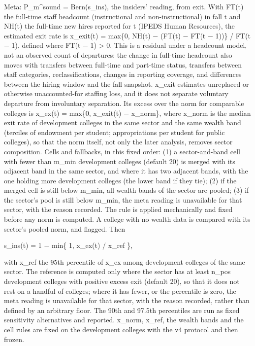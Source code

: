 \documentclass[
]{article}
\begin{document}
Meta: P\_m\^{}sound = Bern(s\_ins), the insiders' reading, from exit.
With FT(t) the full-time staff headcount (instructional and
non-instructional) in fall t and NH(t) the full-time new hires reported
for t (IPEDS Human Resources), the estimated exit rate is x\_exit(t) =
max\{0, NH(t) − (FT(t) − FT(t − 1))\} / FT(t − 1), defined where FT(t −
1) \textgreater{} 0. This is a residual under a headcount model, not an
observed count of departures: the change in full-time headcount also
moves with transfers between full-time and part-time status, transfers
between staff categories, reclassifications, changes in reporting
coverage, and differences between the hiring window and the fall
snapshot. x\_exit estimates unreplaced or otherwise unaccounted-for
staffing loss, and it does not separate voluntary departure from
involuntary separation. Its excess over the norm for comparable colleges
is x\_ex(t) = max\{0, x\_exit(t) − x\_norm\}, where x\_norm is the
median exit rate of development colleges in the same sector and the same
wealth band (terciles of endowment per student; appropriations per
student for public colleges), so that the norm itself, not only the
later analysis, removes sector composition. Cells and fallbacks, in this
fixed order: (1) a sector-and-band cell with fewer than m\_min
development colleges (default 20) is merged with its adjacent band in
the same sector, and where it has two adjacent bands, with the one
holding more development colleges (the lower band if they tie); (2) if
the merged cell is still below m\_min, all wealth bands of the sector
are pooled; (3) if the sector's pool is still below m\_min, the meta
reading is unavailable for that sector, with the reason recorded. The
rule is applied mechanically and fixed before any norm is computed. A
college with no wealth data is compared with its sector's pooled norm,
and flagged. Then

s\_ins(t) = 1 − min\{ 1, x\_ex(t) / x\_ref \},

with x\_ref the 95th percentile of x\_ex among development colleges of
the same sector. The reference is computed only where the sector has at
least n\_pos development colleges with positive excess exit (default
20), so that it does not rest on a handful of colleges; where it has
fewer, or the percentile is zero, the meta reading is unavailable for
that sector, with the reason recorded, rather than defined by an
arbitrary floor. The 90th and 97.5th percentiles are run as fixed
sensitivity alternatives and reported. x\_norm, x\_ref, the wealth bands
and the cell rules are fixed on the development colleges with the v4
protocol and then frozen.
\end{document}

